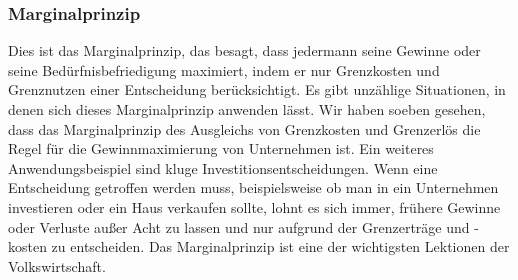 \documentclass[10pt]{scrartcl}
\begin{document}
\subsubsection{Marginalprinzip}
Dies ist das Marginalprinzip, das besagt, dass jedermann seine Gewinne oder seine Bedürfnisbefriedigung maximiert, indem er nur Grenzkosten und Grenznutzen einer Entscheidung berücksichtigt. Es gibt unzählige Situationen, in denen sich dieses Marginalprinzip anwenden lässt. Wir haben soeben gesehen, dass das Marginalprinzip des Ausgleichs von Grenzkosten und Grenzerlös die Regel für die Gewinnmaximierung von Unternehmen ist. Ein weiteres Anwendungsbeispiel sind kluge Investitionsentscheidungen. Wenn eine Entscheidung getroffen werden muss, beispielsweise ob man in ein Unternehmen investieren oder ein Haus verkaufen sollte, lohnt es sich immer, frühere Gewinne oder Verluste außer Acht zu lassen und nur aufgrund der Grenzerträge und -kosten zu entscheiden. Das Marginalprinzip ist eine der wichtigsten Lektionen der Volkswirtschaft.
\end{document}
